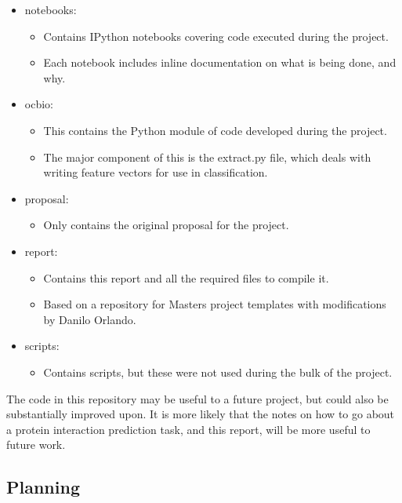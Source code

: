 \begin{itemize}
    \item notebooks:
        \begin{itemize}
            \item Contains IPython notebooks covering code executed during the project.
            \item Each notebook includes inline documentation on what is being done, and why.
        \end{itemize}
    \item ocbio:
        \begin{itemize}
            \item This contains the Python module of code developed during the project.
            \item The major component of this is the extract.py file, which deals with writing feature vectors for use in classification.
        \end{itemize}
    \item proposal:
        \begin{itemize}
            \item Only contains the original proposal for the project.
        \end{itemize}
    \item report:
        \begin{itemize}
            \item Contains this report and all the required files to compile it.
            \item Based on a repository for Masters project templates\cite{ug4template} with modifications by Danilo Orlando.
        \end{itemize}
    \item scripts:
        \begin{itemize}
            \item Contains scripts, but these were not used during the bulk of the project.
        \end{itemize}
\end{itemize}

The code in this repository may be useful to a future project, but could also be substantially improved upon.
It is more likely that the notes on how to go about a protein interaction prediction task, and this report, will be more useful to future work.

\subsection{Planning}

